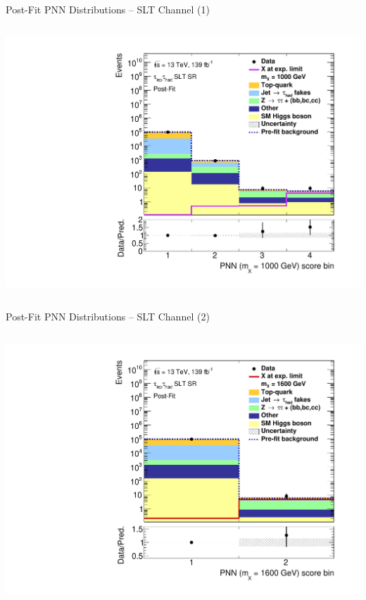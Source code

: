 \documentclass[11pt, xcolor={dvipsnames}, aspectratio=169, notes]{beamer}
\begin{document}
\begin{frame}{Post-Fit PNN Distributions -- \allbold{\lephad} SLT Channel (1)}
\begin{columns}
    \centering


    \includegraphics[width=\textwidth]{results_res/postfit/Region_BMin0_incJet1_dist1000_J2_D2HDMPNN_T2_SpcTauLH_Y2015_LTT0_L1_GlobalFit_conditionnal_mu0log}

  \end{columns}
\end{frame}


\begin{frame}{Post-Fit PNN Distributions -- \allbold{\lephad} SLT Channel (2)}
  \begin{columns}
    \centering


    \includegraphics[width=\textwidth]{results_res/postfit/Region_BMin0_incJet1_dist1600_J2_D2HDMPNN_T2_SpcTauLH_Y2015_LTT0_L1_GlobalFit_conditionnal_mu0log}

  \end{columns}
\end{frame}
\end{document}
